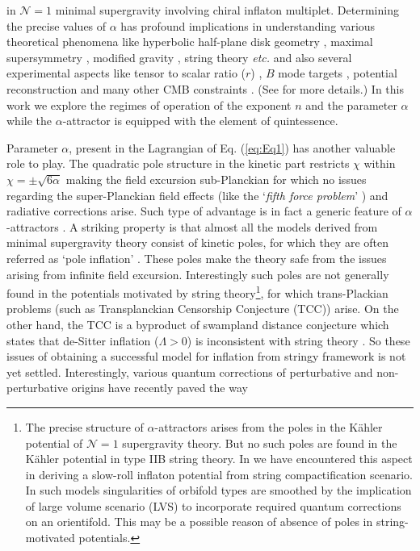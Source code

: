 \documentclass[a4paper,11pt]{article}
\begin{document}
in $\mathcal{N}=1$ minimal supergravity involving chiral inflaton multiplet. Determining the precise values of $\alpha$ has profound implications in understanding various theoretical phenomena like hyperbolic half-plane disk geometry \cite{Carrasco:2015rva,Kallosh:2015zsa,Carrasco:2015uma}, maximal supersymmetry \cite{Kallosh:2017ced}, modified gravity \cite{Odintsov:2016vzz}, string theory \cite{Scalisi:2018eaz,Kallosh:2017wku,Kallosh:2021vcf} \textit{etc.} and also several experimental aspects like tensor to scalar ratio ($r$) \cite{Kallosh:2019hzo}, $B$ mode targets \cite{Kallosh:2019eeu,Ferrara:2016fwe}, potential reconstruction \cite{Planck:2018jri} and many other CMB constraints \cite{Planck:2018vyg}. (See \cite{Sarkar:2021ird} for more details.) In this work we explore the regimes of operation of the exponent $n$ and the parameter $\alpha$ while the $\alpha$-attractor is equipped with the element of quintessence.\par Parameter $\alpha$, present in the Lagrangian of Eq. (\ref{eq:Eq1}) has another valuable role to play. The quadratic pole structure in the kinetic part restricts $\chi$ within $\chi = \pm \sqrt{6\alpha}$ making the field excursion sub-Planckian for which no issues regarding the super-Planckian field effects (like the `\textit{fifth force problem}' \cite{Wetterich:2004ff,Dimopoulos:2017zvq,Dimopoulos:2022wzo}) and radiative corrections \cite{Linde:2017pwt,Kallosh:2016gqp} arise. Such type of advantage is in fact a generic feature of $\alpha$-attractors \cite{Chojnacki:2021fag,Kallosh:2016gqp}. A striking property is that almost all the models derived from minimal supergravity theory consist of kinetic poles, for which they are often referred as `pole inflation' \cite{Pallis:2022cnm,Karamitsos:2019vor,Dias:2018pgj,Saikawa:2017wkg}. These poles make the theory safe from the issues arising from infinite field excursion. Interestingly such poles are not generally found in the potentials motivated by string theory\footnote{The precise structure of $\alpha$-attractors arises from the poles in the K\"{a}hler potential of $\mathcal{N}=1$ supergravity theory. But no such poles are found in the K\"{a}hler potential in type IIB string theory. In \cite{Let:2022fmu} we have encountered this aspect in deriving a slow-roll inflaton potential from string compactification scenario. In such models singularities of orbifold types are smoothed by the implication of large volume scenario (LVS) to incorporate required quantum corrections on an orientifold. This may be a possible reason of absence of poles in string-motivated potentials.}, for which trans-Plackian problems (such as Transplanckian Censorship Conjecture (TCC)) \cite{Bedroya:2019tba,Brandenberger:2021pzy,Cai:2019dzj} arise. On the other hand, the TCC is a byproduct of swampland distance conjecture \cite{Brahma:2019vpl,Bedroya:2019snp,Andriot:2020lea,Saito:2019tkc,Draper:2019utz} which states that de-Sitter inflation ($\Lambda>0$) is inconsistent with string theory \cite{Obied:2018sgi,Dasgupta:2019gcd,Garg:2018reu}. So these issues of obtaining a successful model for inflation from stringy framework is not yet settled. Interestingly, various quantum corrections of perturbative and non-perturbative origins have recently paved the way \cite{Let:2022fmu} 
\end{document}

